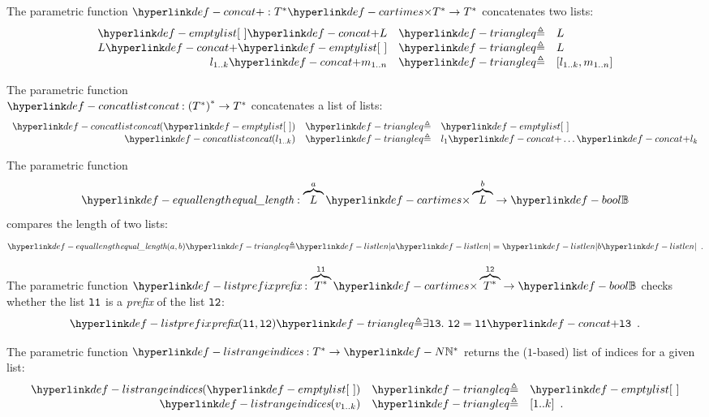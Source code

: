 \hypertarget{def-concat}{}
\begin{definition}
The parametric function $\concat : T^* \cartimes T^* \rightarrow T^*$ concatenates two lists:
\[
    \begin{array}{rcl}
    \emptylist \concat L &\triangleq& L\\
    L \concat \emptylist &\triangleq& L\\
    l_{1..k} \concat m_{1..n} &\triangleq& [l_{1..k}, m_{1..n}]
    \end{array}
\]
\end{definition}

\hypertarget{def-concatlist}{}
\begin{definition}
The parametric function\\
$\concatlist : \left(T^*\right)^* \rightarrow T^*$ concatenates a list of lists:
\[
  \begin{array}{rcl}
    \concatlist(\emptylist) &\triangleq& \emptylist\\
    \concatlist(l_{1..k}) &\triangleq& l_1 \concat \ldots \concat l_k \\
  \end{array}
\]
\end{definition}

\hypertarget{def-equallength}{}
\begin{definition}
The parametric function
\[
  \equallength : \overname{L}{a} \cartimes \overname{L}{b} \rightarrow \Bool
\]
compares the length of two lists:
\[
\equallength(a, b) \triangleq \listlen{a}=\listlen{b} \enspace.
\]
\end{definition}

\hypertarget{def-listprefix}{}
\begin{definition}
The parametric function $\listprefix : \overname{T^*}{\vlone} \cartimes \overname{T^*}{\vltwo} \rightarrow \Bool$ checks whether
the list $\texttt{l1}$ is a \emph{prefix} of the list $\texttt{l2}$:
\[
\listprefix(\vlone, \vltwo) \triangleq \exists \vlthree.\ \vltwo = \vlone \concat \vlthree \enspace.
\]
\end{definition}

\hypertarget{def-listrange}{}
\begin{definition}
The parametric function $\listrange : T^* \rightarrow \N^*$ returns the ($1$-based) list of indices for a given list:
\[
    \begin{array}{rcl}
        \listrange(\emptylist) &\triangleq& \emptylist\\
        \listrange(v_{1..k}) &\triangleq& [1..k] \enspace.
    \end{array}
\]
\end{definition}

